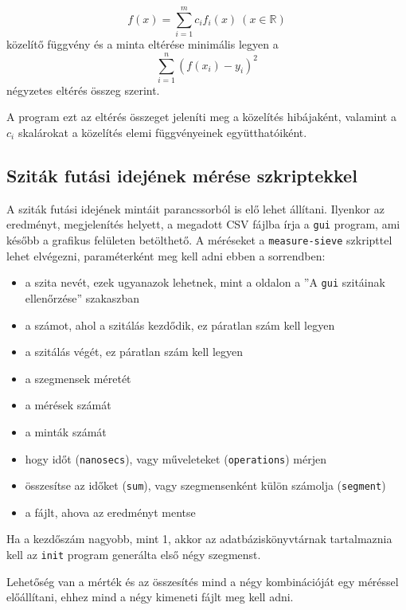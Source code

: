 \begin{equation*}
f(x)=\sum_{i=1}^m c_i f_i(x)\ (x \in \mathbb{R})
\end{equation*}
közelítő függvény és a minta eltérése minimális legyen a
\begin{equation*}
\sum_{i=1}^{n} (f(x_i)-y_i)^2
\end{equation*}
négyzetes eltérés összeg szerint.

A program ezt az eltérés összeget jeleníti meg a közelítés hibájaként, valamint a $c_i$ skalárokat a közelítés elemi függvényeinek együtthatóiként.

\subsection{Sziták futási idejének mérése szkriptekkel}

A sziták futási idejének mintáit parancssorból is elő lehet állítani.
Ilyenkor az eredményt, megjelenítés helyett, a megadott CSV fájlba írja a \texttt{gui} program, ami később a grafikus felületen betölthető.
A méréseket a \texttt{measure-sieve} szkripttel lehet elvégezni, paraméterként meg kell adni ebben a sorrendben:
\begin{itemize}
\item a szita nevét, ezek ugyanazok lehetnek, mint a \pageref{sec:szitak-ellenorzese} oldalon a ''A \texttt{gui} szitáinak ellenőrzése'' szakaszban
\item a számot, ahol a szitálás kezdődik, ez páratlan szám kell legyen
\item a szitálás végét, ez páratlan szám kell legyen
\item a szegmensek méretét
\item a mérések számát
\item a minták számát
\item hogy időt (\texttt{nanosecs}), vagy műveleteket (\texttt{operations}) mérjen
\item összesítse az időket (\texttt{sum}), vagy szegmensenként külön számolja (\texttt{segment})
\item a fájlt, ahova az eredményt mentse
\end{itemize}

Ha a kezdőszám nagyobb, mint 1, akkor az adatbáziskönyvtárnak tartalmaznia kell az \texttt{init} program generálta első négy szegmenst.

Lehetőség van a mérték és az összesítés mind a négy kombinációját egy méréssel előállítani, ehhez mind a négy kimeneti fájlt meg kell adni.

